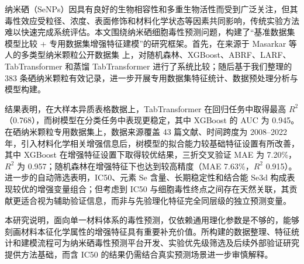 纳米硒（SeNPs）因具有良好的生物相容性和多重生物活性而受到广泛关注，但其毒性效应受粒径、浓度、表面修饰和材料化学状态等因素共同影响，传统实验方法难以快速完成系统评估。本文围绕纳米硒细胞毒性预测问题，构建了“基准数据集模型比较 + 专用数据集增强特征建模”的研究框架。首先，在来源于 Masarkar 等人的多类型纳米颗粒公开数据集 \cite{masarkar2024} 上，对随机森林、XGBoost、ABRF、LARF、TabTransformer 和蒸馏 TabTransformer 进行了系统比较；随后基于我们整理的 383 条硒纳米颗粒有效记录，进一步开展专用数据集特征统计、数据预处理分析与模型构建。

结果表明，在大样本异质表格数据上，TabTransformer 在回归任务中取得最高 $R^2$（0.768），而树模型在分类任务中表现更稳定，其中 XGBoost 的 AUC 为 0.945。在硒纳米颗粒专用数据集上，数据来源覆盖 43 篇文献、时间跨度为 2008--2022 年，引入材料化学相关增强信息后，树模型的拟合能力较基础特征设置有所改善，其中 XGBoost 在增强特征设置下取得较优结果，三折交叉验证 MAE 为 7.20\%，$R^2$ 为 0.957；随机森林在增强特征下也达到较高精度（MAE 7.63\%，$R^2$ 0.915）。进一步的自动筛选表明，IC50、元素 Se 含量、长期稳定性和结合能 Se3d 构成表现较优的增强变量组合；但考虑到 IC50 与细胞毒性终点之间存在天然关联，其贡献更适合视为辅助验证信息，而非与先验理化特征完全同层级的独立预测变量。

本研究说明，面向单一材料体系的毒性预测，仅依赖通用理化参数是不够的，能够刻画材料本征化学属性的增强特征具有重要补充价值。所构建的数据整理、特征统计和建模流程可为纳米硒毒性预测平台开发、实验优先级筛选及后续外部验证研究提供方法基础，而含 IC50 的结果仍需结合真实预测场景进一步审慎解释。
